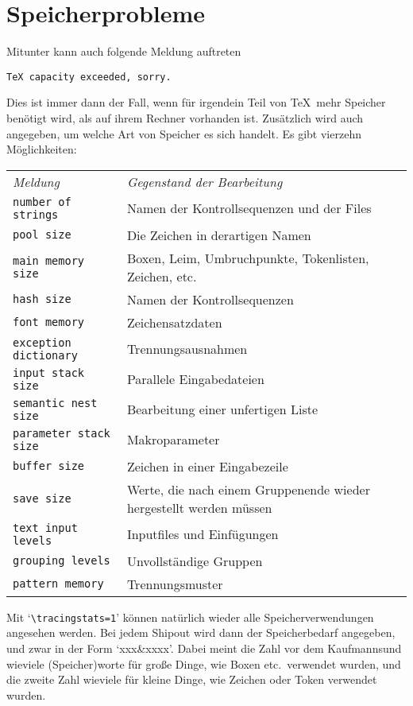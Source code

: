 \section{Speicherprobleme}
Mitunter kann auch folgende Meldung auftreten
\begin{verbatim}
TeX capacity exceeded, sorry.
\end{verbatim}
Dies ist immer dann der Fall, wenn f\"ur irgendein Teil von \TeX\ mehr
Speicher ben\"otigt wird, als auf ihrem Rechner vorhanden ist.
Zus\"atzlich wird auch angegeben, um welche Art von Speicher es sich
handelt. Es gibt vierzehn M\"oglichkeiten:

\medskip\begin{tabular}{lp{8cm}}
{\em Meldung} & {\em Gegenstand der Bearbeitung}\\[.5ex]
{\tt number of strings} & Namen der \index{Kontrollsequenz}
Kontrollsequenzen und der Files\\
{\tt pool size} & Die Zeichen in derartigen Namen\\
{\tt main memory size} & Boxen, \index{Leim}Leim, Umbruchpunkte, Tokenlisten,
Zeichen, etc.\\
{\tt hash size} & Namen der Kontrollsequenzen\\
{\tt font memory} & Zeichensatzdaten\\
{\tt exception dictionary} & Trennungsausnahmen\\
{\tt input stack size} & Parallele Eingabedateien\\
{\tt semantic nest size} & Bearbeitung einer unfertigen Liste\\
{\tt parameter stack size} & Makroparameter\\
{\tt buffer size} & Zeichen in einer Eingabezeile\\
{\tt save size} & Werte, die nach einem Gruppenende wieder hergestellt
werden m\"ussen\\
{\tt text input levels} & Inputfiles und Einf\"ugungen\\
{\tt grouping levels} & Unvollst\"andige Gruppen\\
{\tt pattern memory} & Trennungsmuster
\end{tabular}\medskip

Mit 
`\verb|\tracingstats=1|' k\"onnen nat\"urlich wieder alle
Speicherverwendungen angesehen werden. Bei jedem Shipout wird dann der
Speicherbedarf angegeben, und zwar in der Form `xxx\&xxxx'. Dabei
meint die Zahl vor dem 
Kaufmannsund wieviele (Speicher)worte f\"ur gro\ss{}e
Dinge, wie Boxen etc.\ verwendet wurden, und die zweite Zahl wieviele
f\"ur kleine Dinge, wie Zeichen oder Token verwendet wurden.

